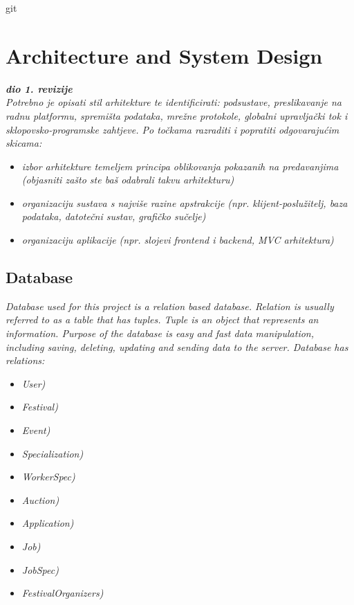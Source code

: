 git \chapter{Architecture and System Design}
		
		\textbf{\textit{dio 1. revizije}}\\

		\textit{ Potrebno je opisati stil arhitekture te identificirati: podsustave, preslikavanje na radnu platformu, spremišta podataka, mrežne protokole, globalni upravljački tok i sklopovsko-programske zahtjeve. Po točkama razraditi i popratiti odgovarajućim skicama:}
	\begin{itemize}
		\item 	\textit{izbor arhitekture temeljem principa oblikovanja pokazanih na predavanjima (objasniti zašto ste baš odabrali takvu arhitekturu)}
		\item 	\textit{organizaciju sustava s najviše razine apstrakcije (npr. klijent-poslužitelj, baza podataka, datotečni sustav, grafičko sučelje)}
		\item 	\textit{organizaciju aplikacije (npr. slojevi frontend i backend, MVC arhitektura) }		
	\end{itemize}

	
		

		

				
		\section{Database}
			
			
		\textit{Database used for this project is a relation based database. Relation is usually referred to as a table that has tuples. Tuple is an object that represents an information. Purpose of the database is easy and fast data manipulation, including saving, deleting, updating and sending data to the server. Database has relations:}
	\begin{itemize}
			\item 	\textit{User)}
			\item 	\textit{Festival)}
			\item 	\textit{Event)}
			\item 	\textit{Specialization)}
			\item 	\textit{WorkerSpec)}
			\item 	\textit{Auction)}
			\item 	\textit{Application)}
			\item 	\textit{Job)}
			\item 	\textit{JobSpec)}
			\item 	\textit{FestivalOrganizers)}



		\end{itemize}
		
